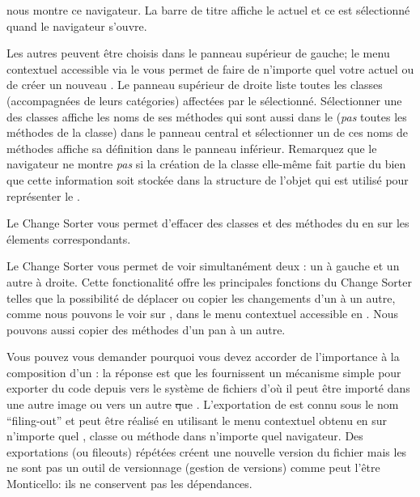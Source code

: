 \documentclass[a4paper,10pt,twoside]{book}
\begin{document}
 nous montre ce navigateur. La barre de titre affiche le \changeset actuel et ce \changeset est sélectionné quand le navigateur s'ouvre.

Les autres \changesets peuvent être choisis dans le panneau supérieur de gauche;
le menu contextuel accessible via le  vous permet de faire de
n'importe quel \changeset votre \changeset actuel ou de créer un nouveau \changeset.
Le panneau supérieur de droite liste toutes les classes 
(accompagnées de leurs catégories) affectées par le \changeset sélectionné.
Sélectionner une des classes affiche les noms de ses méthodes qui sont aussi dans
le \changeset (\emph{pas} toutes les méthodes de la classe) dans le panneau central
et sélectionner un de ces noms de méthodes affiche sa définition dans le panneau
inférieur.
Remarquez que le navigateur ne montre \emph{pas} si la création de la classe elle-même
fait partie du \changeset bien que cette information soit stockée dans la structure
de l'objet qui est utilisé pour représenter le \changeset.

Le Change Sorter vous permet d'effacer des classes et des méthodes du \changeset
en  \actclickant{} sur les élements correspondants.

Le Change Sorter vous permet de voir simultanément deux
\changesets: un \changeset à gauche et un autre à droite.
Cette fonctionalité offre les principales fonctions du Change Sorter 
telles que la possibilité de déplacer ou copier les changements d'un \changeset à un autre,
comme nous pouvons le voir sur ,
dans le menu contextuel accessible en \actclickant.
Nous pouvons aussi copier des méthodes d'un pan à un autre.

Vous pouvez vous demander pourquoi vous devez accorder de l'importance à la composition
d'un \changeset: la réponse est que les \changesets fournissent un mécanisme simple
pour exporter du code depuis \pharo vers le système de fichiers d'où il peut
être importé dans une autre image \pharo ou vers un autre \st que \pharo.
L'exportation de \changeset est connu sous le nom ``filing-out'' et peut être réalisé
en utilisant le menu contextuel obtenu en \actclickant{} sur n'importe quel \changeset, classe ou
méthode dans n'importe quel navigateur.
Des exportations (ou fileouts) répétées créent une nouvelle version du fichier
mais les \changesets ne sont pas un outil de versionnage (gestion de
versions) comme peut l'être Monticello:
ils ne conservent pas les dépendances.
\end{document}
